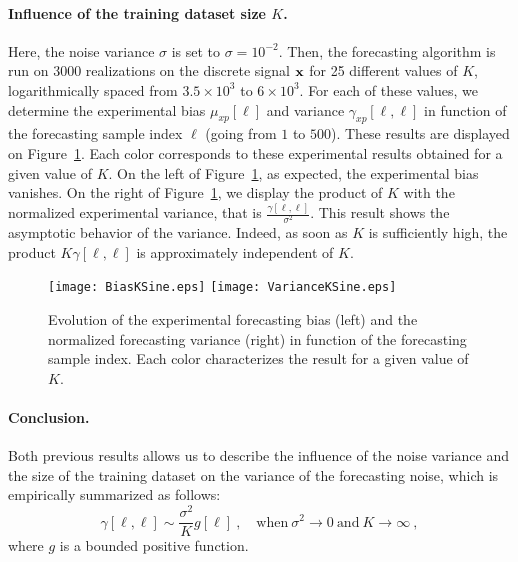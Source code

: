 \paragraph{Influence of the training dataset size $K$.} Here, the noise variance $\sigma$ is set to $\sigma=10^{-2}$. Then, the forecasting algorithm is run on 3000 realizations on the discrete signal ${\mathbf x}$ for 25 different values of $K$, logarithmically spaced from $3.5\times 10^{3}$ to $6\times 10^{3}$. For each of these values, we determine the experimental bias $\mu_{xp}[\ell]$ and variance $\gamma_{xp}[\ell,\ell]$ in function of the forecasting sample index $\ell$ (going from $1$ to $500$). These results are displayed on Figure~\ref{fig:res.size.sine}. Each color corresponds to these experimental results obtained for a given value of $K$. On the left of Figure~\ref{fig:res.size.sine}, as expected, the experimental bias vanishes. On the right of Figure~\ref{fig:res.size.sine}, we display the product of $K$ with the normalized experimental variance, that is $\frac{\gamma[\ell,\ell]}{\sigma^2}$. This result shows the asymptotic behavior of the variance. Indeed, as soon as $K$ is sufficiently high, the product $K\gamma[\ell,\ell]$ is approximately independent of $K$.
\begin{figure}
\texttt{[image: BiasKSine.eps]}
\texttt{[image: VarianceKSine.eps]}
\caption{Evolution of the experimental forecasting bias (left) and the normalized forecasting variance (right) in function of the forecasting sample index. Each color characterizes the result for a given value of $K$.}
\label{fig:res.size.sine}
\end{figure}

\paragraph{Conclusion.}
Both previous results allows us to describe the influence of the noise variance and the size of the training dataset on the variance of the forecasting noise, which is empirically summarized as follows:
\begin{equation}
\gamma[\ell,\ell] \sim \dfrac{\sigma^2}{K}g[\ell] \ ,\quad\mbox{when}\ \sigma^2\to 0\ \mbox{and}\ K\to\infty \ ,
\end{equation} 
where $g$ is a bounded positive function.

